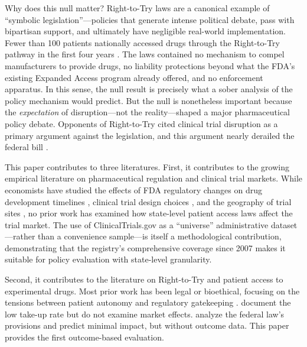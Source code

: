 \documentclass[12pt]{article}
\begin{document}
Why does this null matter? Right-to-Try laws are a canonical example of ``symbolic legislation''---policies that generate intense political debate, pass with bipartisan support, and ultimately have negligible real-world implementation. Fewer than 100 patients nationally accessed drugs through the Right-to-Try pathway in the first four years \citep{frank2019policy}. The laws contained no mechanism to compel manufacturers to provide drugs, no liability protections beyond what the FDA's existing Expanded Access program already offered, and no enforcement apparatus. In this sense, the null result is precisely what a sober analysis of the policy mechanism would predict. But the null is nonetheless important because the \textit{expectation} of disruption---not the reality---shaped a major pharmaceutical policy debate. Opponents of Right-to-Try cited clinical trial disruption as a primary argument against the legislation, and this argument nearly derailed the federal bill \citep{darrow2018practical}.

This paper contributes to three literatures. First, it contributes to the growing empirical literature on pharmaceutical regulation and clinical trial markets. While economists have studied the effects of FDA regulatory changes on drug development timelines \citep{dimasi2003price, berndt2005speed}, clinical trial design choices \citep{hampton2023trial}, and the geography of trial sites \citep{thiers2008trends}, no prior work has examined how state-level patient access laws affect the trial market. The use of ClinicalTrials.gov as a ``universe'' administrative dataset---rather than a convenience sample---is itself a methodological contribution, demonstrating that the registry's comprehensive coverage since 2007 makes it suitable for policy evaluation with state-level granularity.

Second, it contributes to the literature on Right-to-Try and patient access to experimental drugs. Most prior work has been legal or bioethical, focusing on the tensions between patient autonomy and regulatory gatekeeping \citep{bateman2015right, dresser2016right, shah2017right}. \citet{frank2019policy} document the low take-up rate but do not examine market effects. \citet{darrow2018practical} analyze the federal law's provisions and predict minimal impact, but without outcome data. This paper provides the first outcome-based evaluation.
\end{document}
